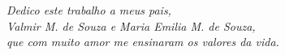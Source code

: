\begin{dedicatoria}
   \vspace*{\fill}
   \begin{flushright}
   	\textit{Dedico este trabalho a meus pais, \\ Valmir M. de Souza e Maria Emilia M. de Souza, \\ que com muito amor me ensinaram os valores da vida.}
   	
   \end{flushright}
\end{dedicatoria}
